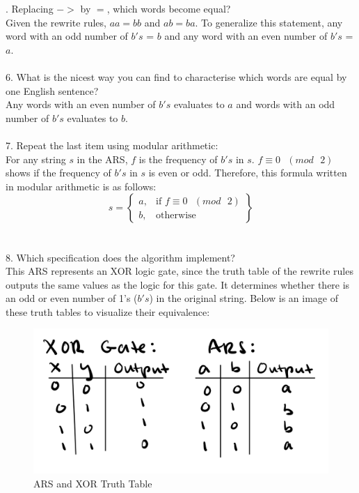 \documentclass{article}
\theoremstyle{theorem}
\theoremstyle{definition}
\theoremstyle{remark}
\begin{document}
. Replacing $->$ by $=$,  which words become equal?
\\\indent Given the rewrite rules, $aa = bb$ and $ab = ba$. To generalize this statement, any word with an odd number of $b's$ = $b$ and any word with an even number of $b's$ = $a$.
\\
\\
6. What is the nicest way you can find to characterise which words are equal by one English sentence?
\\\indent Any words with an even number of $b's$ evaluates to $a$ and words with an odd number of $b's$ evaluates to $b$.
\\
\\
7. Repeat the last item using modular arithmetic:
\\\indent For any string $s$ in the ARS, $f$ is the frequency of $b's$ in $s$. $f \equiv 0 \text{ }(mod \text{ }2)$ shows if the frequency of $b's$ in $s$ is even or odd. Therefore, this formula written in modular arithmetic is as follows:
\begin{equation}
s = 
\left\{
    \begin{array}{lr}
        a, & \text{if } f \equiv 0 \text{ }(mod \text{ }2)\\
        b, & \text{otherwise}
    \end{array}
\right\}
\end{equation}
\\
\\
8. Which specification does the algorithm implement?
\\\indent This ARS represents an XOR logic gate, since the truth table of the rewrite rules outputs the same values as the logic for this gate. It determines whether there is an odd or even number of 1's ($b's$) in the original string. Below is an image of these truth tables to visualize their equivalence:

\begin{figure}[H]
\begin{center}
\includegraphics[scale=0.6]{img/TruthTable.png}
\end{center}
\caption{ARS and XOR Truth Table}\label{WS}
\end{figure}
\end{document}
